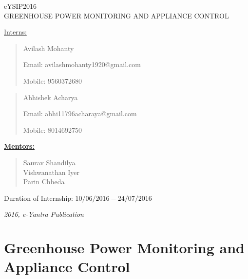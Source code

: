 \documentclass[a4paper,12pt,oneside]{book}
\begin{document}
\begin{titlepage}
	\raggedright
	{\Large eYSIP2016\\[1cm]}
	{\Large\scshape GREENHOUSE POWER MONITORING AND APPLIANCE CONTROL \\[.1in]}
	
	\vfill
	
	{\underline{\large{Interns:}}} \\
	\begin{quote}
		\large{Avilash Mohanty}
		
		\large{Email: avilashmohanty1920@gmail.com}		
		
		\large{Mobile: 9560372680}
	\end{quote}
	
	
	
	\begin{quote}
		\large{Abhishek Acharya}
		
		\large{Email: abhi11796acharaya@gmail.com}	
		
		\large{Mobile: 8014692750}
	\end{quote}
	
	
	\vspace{0.5cm}
	
	{\underline{\textbf{Mentors:}}} \\
	\begin{quote}
		\large{Saurav Shandilya}\\
		\large{Vishwanathan Iyer}\\
		\large{Parin Chheda}\\
	
		
	\end{quote}
	
	
	
	\begin{flushright}
		{\large Duration of Internship: $ 10/06/2016-24/07/2016 $ \\}
		
	\end{flushright}
	{\itshape 2016, e-Yantra Publication}
	
	
	
\end{titlepage}

\tableofcontents
\chapter[Greenhouse Power Monitoring and Appliance Control]{Greenhouse Power Monitoring and Appliance Control }
\end{document}
